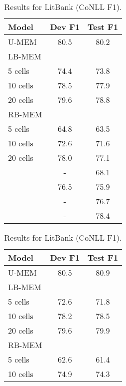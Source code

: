 \documentclass[12pt]{thesis-umich}[thesis]
\newcommand{\unbounded}{U-MEM\xspace}
\newcommand{\learned}{LB-MEM\xspace}
\newcommand{\lru}{RB-MEM\xspace}
\begin{document}
\begin{table}[t]
\parbox{.45\linewidth}{
\centering
\small


\begin{tabular}{lcc}
\toprule
Model & Dev F1 & Test F1 \\\midrule
\unbounded & 80.5 & 80.2 \\
\learned &  & \\
\hspace{0.1in} 5 cells & 74.4 & 73.8 \\
\hspace{0.1in} 10 cells & 78.5 & 77.9 \\
\hspace{0.1in} 20 cells & 79.6 & 78.8 \\
\lru & & \\
\hspace{0.1in} 5 cells & 64.8 & 63.5 \\
\hspace{0.1in} 10 cells & 72.6 & 71.6 \\
\hspace{0.1in} 20 cells & 78.0 & 77.1  \\\midrule
\citet{bamman2019annotated} & - & 68.1 \\
\citet{toshniwal-etal-2020-learning} & 76.5 & 75.9 \\
\citet{xia-van-durme-2021-moving} & - & 76.7 \\
\citet{thirukovalluru-etal-2021-scaling} & - & 78.4 \\
\bottomrule
\end{tabular}
\caption{Results for LitBank (CoNLL F1).}
\label{tab:res_litbank}
}
\hfill
\parbox{.48\linewidth}{
\centering
\small
\begin{tabular}{lcc}
\toprule
Model & Dev F1 & Test F1 \\\midrule
\unbounded & 80.5 & 80.9  \\
\learned &  & \\
\hspace{0.1in} 5 cells  & 72.6 & 71.8  \\
\hspace{0.1in} 10 cells  & 78.2 & 78.5  \\
\hspace{0.1in} 20 cells  & 79.6 & 79.9  \\
\lru & & \\
\hspace{0.1in} 5 cells   & 62.6 & 61.4  \\
\hspace{0.1in} 10 cells   & 74.9 & 74.3  \\

\end{tabular}}
\end{table}
\end{document}
